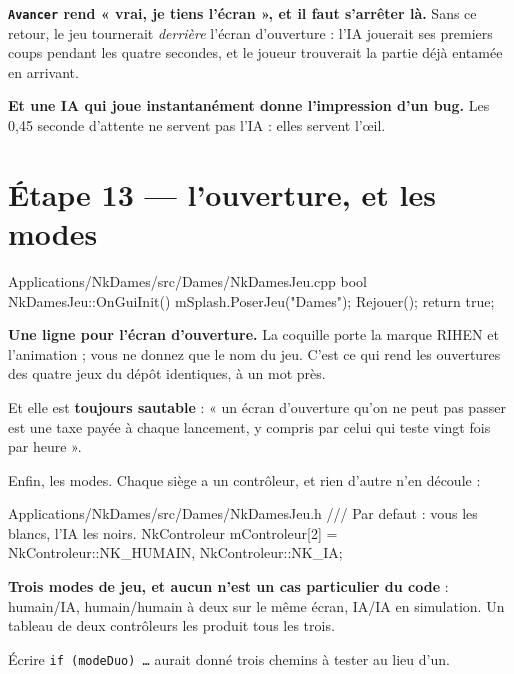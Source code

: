 \begin{nkpiege}
\textbf{\texttt{Avancer} rend « vrai, je tiens l'écran », et il faut s'arrêter
là.} Sans ce retour, le jeu tournerait \emph{derrière} l'écran d'ouverture :
l'IA jouerait ses premiers coups pendant les quatre secondes, et le joueur
trouverait la partie déjà entamée en arrivant.

\textbf{Et une IA qui joue instantanément donne l'impression d'un bug.} Les
0,45 seconde d'attente ne servent pas l'IA : elles servent l'\oe il.
\end{nkpiege}

\section{Étape 13 --- l'ouverture, et les modes}

\begin{nkcode}{Applications/NkDames/src/Dames/NkDamesJeu.cpp}
bool NkDamesJeu::OnGuiInit() {
    mSplash.PoserJeu("Dames");
    Rejouer();
    return true;
}
\end{nkcode}

\begin{nkretenir}
\textbf{Une ligne pour l'écran d'ouverture.} La coquille porte la marque RIHEN
et l'animation ; vous ne donnez que le nom du jeu. C'est ce qui rend les
ouvertures des quatre jeux du dépôt identiques, à un mot près.

Et elle est \textbf{toujours sautable} : « un écran d'ouverture qu'on ne peut pas
passer est une taxe payée à chaque lancement, y compris par celui qui teste
vingt fois par heure ».
\end{nkretenir}

Enfin, les modes. Chaque siège a un contrôleur, et rien d'autre n'en découle :

\begin{nkcode}{Applications/NkDames/src/Dames/NkDamesJeu.h}
/// Par defaut : vous les blancs, l'IA les noirs.
NkControleur mControleur[2] = {NkControleur::NK_HUMAIN, NkControleur::NK_IA};
\end{nkcode}

\begin{nkretenir}
\textbf{Trois modes de jeu, et aucun n'est un cas particulier du code} :
humain/IA, humain/humain à deux sur le même écran, IA/IA en simulation. Un
tableau de deux contrôleurs les produit tous les trois.

Écrire \texttt{if (modeDuo) \dots} aurait donné trois chemins à tester au lieu
d'un.
\end{nkretenir}

